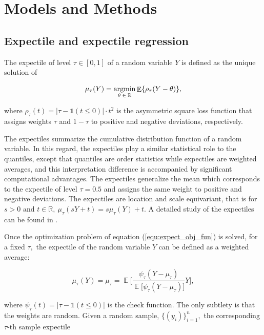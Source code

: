\documentclass[15pt,a4paper]{article}
\DeclareMathOperator{\E}{\mathbb{E}}
\newcommand{\argmin}{\operatornamewithlimits{argmin}}
\begin{document}
\section{Models and Methods} \label{Models_erfe}


\subsection{Expectile and expectile regression}

The expectile of level \(\tau\in[0,1]\) of a random variable \(Y\) is defined as the unique solution of

\begin{equation}\label{equ:expect_obj_fun}
\mu_{\tau}(Y)=\argmin_{\theta\;\in\;\mathbb{R}}
\E\{\rho_\tau(Y-\theta)\},   
\end{equation}

where \(\rho_\tau(t)=\lvert \tau-\mathds{1}(t\leq 0)\rvert \cdot t^2\) is the asymmetric square loss function that assigns weights \(\tau\) and \(1-\tau\) to positive and negative deviations, respectively.

The expectiles summarize the cumulative distribution function of a random variable. In this regard, the expectiles play a similar statistical role to the quantiles, except that quantiles are order statistics while expectiles are weighted averages, and this interpretation difference is accompanied by significant computational advantages. The expectiles generalize the mean which corresponds to the expectile of level $\tau=0.5$ and assigns the same weight to positive and negative deviations. The expectiles are location and scale equivariant, that is for \(s>0 \mbox{ and } t\in\mathbb{R}, \ \mu_{\tau}(sY+t)=s\mu_{\tau}(Y)+t.\) A detailed study of the expectiles can be found in \citep{newey_asymmetric_1987}.


Once the optimization problem of equation (\ref{equ:expect_obj_fun}) is solved, for a fixed $\tau,$ the expectile of the random variable $Y$ can be defined as a weighted average:

\begin{equation*}
   \mu_{\tau}(Y)=\mu_{\tau}= \E\Bigg[ \frac{\psi_{\tau}(Y-\mu_{\tau})}{\E\big[\psi_{\tau}(Y-\mu_{\tau})\big]}Y\Bigg],
\end{equation*}

where \(\psi_{\tau}(t)=\lvert \tau-\mathds{1}(t\leq 0)\rvert\) is the check function. The only subtlety is that the weights are random. Given a random sample, \(\lbrace(y_i)\rbrace_{i=1}^{n},\) the corresponding \(\tau\)-th sample expectile
\end{document}
